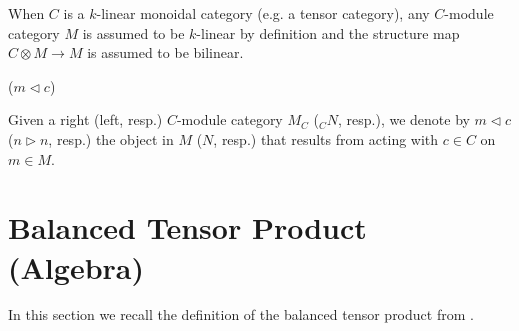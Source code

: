 \begin{assumption}
When $C$ is a $k$-linear monoidal category (e.g. a tensor category), any
$C$-module category $M$ is assumed to be $k$-linear by definition and the
structure map $C\otimes M\to M$ is assumed to be bilinear.
\end{assumption}

\begin{notation} ($m \lhd c$)

Given a right (left, resp.) $C$-module category $M_C$ ($_{C}N$, resp.), we
denote by $m\lhd c$ ($n \rhd n$, resp.) the object in $M$ ($N$, resp.) that
results from acting with $c\in C$ on $m\in M$.

\end{notation}




\section{Balanced Tensor Product (Algebra)}\label{section/balanced-tensor-product}

\noindent In this section we recall the definition of the balanced tensor product
from \cite{douglas/balanced-product}.

